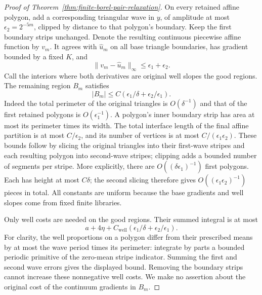 \documentclass[11pt]{article}
\numberwithin{equation}{section}
\begin{document}
\begin{proof}[Proof of Theorem~\ref{thm:finite-borel-pair-relaxation}]
On every retained affine polygon, add a corresponding triangular
wave in $y$, of amplitude at most $\epsilon_2=2^{-5m}$, clipped by
distance to that polygon's boundary. Keep the first boundary strips
unchanged. Denote the resulting continuous piecewise affine function
by $v_m$. It agrees with $\widehat u_m$ on all base triangle boundaries,
has gradient bounded by a fixed $K$, and
\[
 \|v_m-\widehat u_m\|_\infty\le\epsilon_1+\epsilon_2.
\]
Call the interiors where both derivatives are original well slopes
the good regions. The remaining region $B_m$ satisfies
\[
 |B_m|\le C(\epsilon_1/\delta+\epsilon_2/\epsilon_1).
\]
Indeed the total perimeter of the original triangles is
$O(\delta^{-1})$ and that of the first retained polygons is
$O(\epsilon_1^{-1})$. A polygon's inner boundary strip has area
at most its perimeter times its width. The total interface length
of the final affine partition is at most $C/\epsilon_2$, and its
number of vertices is at most $C/(\epsilon_1\epsilon_2)$.
These bounds follow by slicing the original triangles into their
first-wave stripes and each resulting polygon into second-wave
stripes; clipping adds a bounded number of segments per stripe.
More explicitly, there are $O((\delta\epsilon_1)^{-1})$ first
polygons. Each has height at most $C\delta$; the second slicing
therefore gives $O((\epsilon_1\epsilon_2)^{-1})$ pieces in total.
All constants are uniform because the base gradients and well slopes
come from fixed finite libraries.

Only well costs are needed on the good regions. Their summed
integral is at most
\[
 a+4\eta+C_\mathrm{well}
       (\epsilon_1/\delta+\epsilon_2/\epsilon_1).
\]
For clarity, the well proportions on a polygon differ from their
prescribed means by at most the wave period times its perimeter:
integrate by parts a bounded periodic primitive of the zero-mean
stripe indicator. Summing the first and second wave errors gives
the displayed bound. Removing the boundary strips cannot increase
these nonnegative well costs. We make no assertion about the
original cost of the continuum gradients in $B_m$.


\end{proof}
\end{document}
